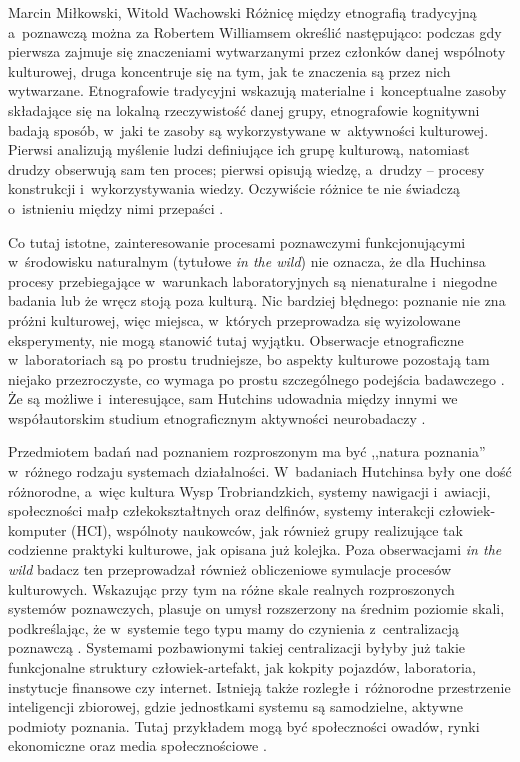 \begin{artplenv2auth}{Marcin Miłkowski, Witold Wachowski}
Różnicę między etnografią tradycyjną a~poznawczą można za Robertem Williamsem określić następująco: podczas gdy pierwsza zajmuje się znaczeniami wytwarzanymi przez członków danej wspólnoty kulturowej, druga koncentruje się na tym, jak te znaczenia są przez nich wytwarzane. Etnografowie tradycyjni wskazują materialne i~konceptualne zasoby składające się na lokalną rzeczywistość danej grupy, etnografowie kognitywni badają sposób, w~jaki te zasoby są wykorzystywane w~aktywności kulturowej. Pierwsi analizują myślenie ludzi definiujące ich grupę kulturową, natomiast drudzy obserwują sam ten proces; pierwsi opisują wiedzę, a~drudzy -- procesy konstrukcji i~wykorzystywania wiedzy. Oczywiście różnice te nie świadczą o~istnieniu między nimi przepaści
\parencite[][s.~838]{williams_using_2006}.%


Co tutaj istotne, zainteresowanie procesami poznawczymi funkcjonującymi w~środowisku naturalnym (tytułowe \textit{in the wild}) nie oznacza, że dla Huchinsa procesy przebiegające w~warunkach laboratoryjnych są nienaturalne i~niegodne badania lub że wręcz stoją poza kulturą. Nic bardziej błędnego: poznanie nie zna próżni kulturowej, więc miejsca, w~których przeprowadza się wyizolowane eksperymenty, nie mogą stanowić tutaj wyjątku. Obserwacje etnograficzne w~laboratoriach są po prostu trudniejsze, bo aspekty kulturowe pozostają tam niejako przezroczyste, co wymaga po prostu szczególnego podejścia badawczego
\parencite[][s.~66–67]{hutchins_response_1996}. %
 Że są możliwe i~interesujące, sam Hutchins udowadnia między innymi we współautorskim studium etnograficznym aktywności neurobadaczy 
\parencite[][]{alac_i_2004}.%


Przedmiotem badań nad poznaniem rozproszonym ma być ,,natura poznania'' w~różnego rodzaju systemach działalności. W~badaniach Hutchinsa były one dość różnorodne, a~więc kultura Wysp Trobriandzkich, systemy nawigacji i~awiacji, społeczności małp człekokształtnych oraz delfinów, systemy interakcji człowiek-komputer (HCI), wspólnoty naukowców, jak również grupy realizujące tak codzienne praktyki kulturowe, jak opisana już kolejka. Poza obserwacjami \textit{in the wild} badacz ten przeprowadzał również obliczeniowe symulacje procesów kulturowych. Wskazując przy tym na różne skale realnych rozproszonych systemów poznawczych, plasuje on umysł rozszerzony na średnim poziomie skali, podkreślając, że w~systemie tego typu mamy do czynienia z~centralizacją poznawczą
\parencite[][s.~37]{hutchins_cultural_2014}. %
 Systemami pozbawionymi takiej centralizacji byłyby już takie funkcjonalne struktury człowiek-artefakt, jak kokpity pojazdów, laboratoria, instytucje finansowe czy internet. Istnieją także rozległe i~różnorodne przestrzenie inteligencji zbiorowej, gdzie jednostkami systemu są samodzielne, aktywne podmioty poznania. Tutaj przykładem mogą być społeczności owadów, rynki ekonomiczne oraz media społecznościowe 
\parencite[][s.~37]{hutchins_cultural_2014}.%



\end{artplenv2auth}
